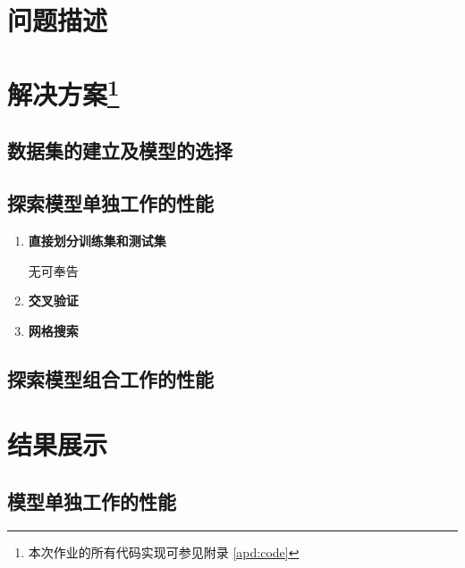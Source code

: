 \documentclass[12pt,a4paper]{article}
\theoremstyle{definition}
\begin{document}
\noindent
\noindent{}

\section{问题描述}



\section{解决方案\protect\footnote{本次作业的所有代码实现可参见附录 \ref{apd:code}}}

\subsection{数据集的建立及模型的选择}


\subsection{探索模型单独工作的性能}

\begin{enumerate}
\item \textbf{直接划分训练集和测试集}

无可奉告

\item \textbf{交叉验证}

\item \textbf{网格搜索}
\end{enumerate}

\subsection{探索模型组合工作的性能}

\section{结果展示}

\subsection{模型单独工作的性能}
\label{sec:pca_res_com}
\end{document}
